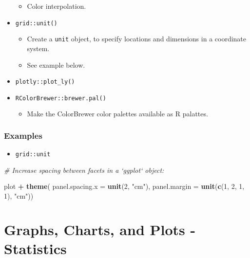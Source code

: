 \documentclass[
]{book}
\newenvironment{Shaded}{\begin{snugshade}}{\end{snugshade}}
\newcommand{\CommentTok}[1]{\textcolor[rgb]{0.56,0.35,0.01}{\textit{#1}}}
\newcommand{\DataTypeTok}[1]{\textcolor[rgb]{0.13,0.29,0.53}{#1}}
\newcommand{\DecValTok}[1]{\textcolor[rgb]{0.00,0.00,0.81}{#1}}
\newcommand{\KeywordTok}[1]{\textcolor[rgb]{0.13,0.29,0.53}{\textbf{#1}}}
\newcommand{\NormalTok}[1]{#1}
\newcommand{\OperatorTok}[1]{\textcolor[rgb]{0.81,0.36,0.00}{\textbf{#1}}}
\newcommand{\StringTok}[1]{\textcolor[rgb]{0.31,0.60,0.02}{#1}}
\providecommand{\tightlist}{%
  \setlength{\itemsep}{0pt}\setlength{\parskip}{0pt}}
\begin{document}
\begin{itemize}
  \begin{itemize}
  \tightlist
  \item
    Color interpolation.
  \end{itemize}
\item
  \texttt{grid::unit()}

  \begin{itemize}
  \tightlist
  \item
    Create a \texttt{unit} object, to specify locations and dimensions in a coordinate system.
  \item
    See example below.
  \end{itemize}
\item
  \texttt{plotly::plot\_ly()}
\item
  \texttt{RColorBrewer::brewer.pal()}

  \begin{itemize}
  \tightlist
  \item
    Make the ColorBrewer color palettes available as R palattes.
  \end{itemize}
\end{itemize}

\hypertarget{examples-3}{%
\subsubsection{Examples}\label{examples-3}}

\begin{itemize}
\tightlist
\item
  \texttt{grid::unit}
\end{itemize}

\begin{Shaded}
\begin{Highlighting}[]
\CommentTok{# Increase spacing between facets in a `ggplot` object:}

\NormalTok{plot }\OperatorTok{+}\StringTok{ }
\StringTok{  }\KeywordTok{theme}\NormalTok{(}
    \DataTypeTok{panel.spacing.x =} \KeywordTok{unit}\NormalTok{(}\DecValTok{2}\NormalTok{, }\StringTok{"cm"}\NormalTok{),}
    \DataTypeTok{panel.margin =} \KeywordTok{unit}\NormalTok{(}\KeywordTok{c}\NormalTok{(}\DecValTok{1}\NormalTok{, }\DecValTok{2}\NormalTok{, }\DecValTok{1}\NormalTok{, }\DecValTok{1}\NormalTok{), }\StringTok{"cm"}\NormalTok{))}
\end{Highlighting}
\end{Shaded}

\hypertarget{graphs-charts-and-plots---statistics}{%
\section{Graphs, Charts, and Plots - Statistics}\label{graphs-charts-and-plots---statistics}}
\end{document}
